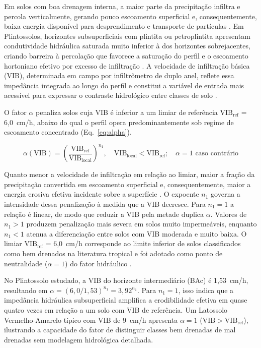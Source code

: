 \documentclass[pdflatex,sn-basic]{sn-jnl}
\begin{document}
Em solos com boa drenagem interna, a maior parte da precipitação infiltra e percola verticalmente, gerando pouco escoamento superficial e, consequentemente, baixa energia disponível para desprendimento e transporte de partículas \citep{deroo_1992}. Em Plintossolos, horizontes subsuperficiais com plintita ou petroplintita apresentam condutividade hidráulica saturada muito inferior à dos horizontes sobrejacentes, criando barreira à percolação que favorece a saturação do perfil e o escoamento hortoniano efetivo por excesso de infiltração \citep{padmanabhan_2005}. A velocidade de infiltração básica (VIB), determinada em campo por infiltrômetro de duplo anel, reflete essa impedância integrada ao longo do perfil e constitui a variável de entrada mais acessível para expressar o contraste hidrológico entre classes de solo \citep{bertoni_lombardi_neto_2017}.

O fator $\alpha$ penaliza solos cuja VIB é inferior a um limiar de referência $\mathrm{VIB_{ref}}$ = 6,0~cm/h, abaixo do qual o perfil opera predominantemente sob regime de escoamento concentrado (Eq.~\ref{eq:alpha}).

\begin{equation}
\alpha(\mathrm{VIB}) = \left(\frac{\mathrm{VIB_{ref}}}{\mathrm{VIB_{local}}}\right)^{n_1}, \quad \mathrm{VIB_{local}} < \mathrm{VIB_{ref}}; \quad \alpha = 1 \text{ caso contrário}
\label{eq:alpha}
\end{equation}

Quanto menor a velocidade de infiltração em relação ao limiar, maior a fração da precipitação convertida em escoamento superficial e, consequentemente, maior a energia erosiva efetiva incidente sobre a superfície \citep{kinnell_2005}. O expoente $n_1$ governa a intensidade dessa penalização à medida que a VIB decresce. Para $n_1 = 1$ a relação é linear, de modo que reduzir a VIB pela metade duplica $\alpha$. Valores de $n_1 > 1$ produzem penalização mais severa em solos muito impermeáveis, enquanto $n_1 < 1$ atenua a diferenciação entre solos com VIB moderada e muito baixa. O limiar $\mathrm{VIB_{ref}}$ = 6,0~cm/h corresponde ao limite inferior de solos classificados como bem drenados na literatura tropical e foi adotado como ponto de neutralidade ($\alpha = 1$) do fator hidráulico \citep{embrapa_2018}.

No Plintossolo estudado, a VIB do horizonte intermediário (BAc) é 1,53~cm/h, resultando em $\alpha = (6{,}0/1{,}53)^{n_1} = 3{,}92^{n_1}$. Para $n_1 = 1$, isso indica que a impedância hidráulica subsuperficial amplifica a erodibilidade efetiva em quase quatro vezes em relação a um solo com VIB de referência. Um Latossolo Vermelho-Amarelo típico com VIB de 9~cm/h apresenta $\alpha = 1$ ($\mathrm{VIB} > \mathrm{VIB_{ref}}$), ilustrando a capacidade do fator de distinguir classes bem drenadas de mal drenadas sem modelagem hidrológica detalhada.
\end{document}
